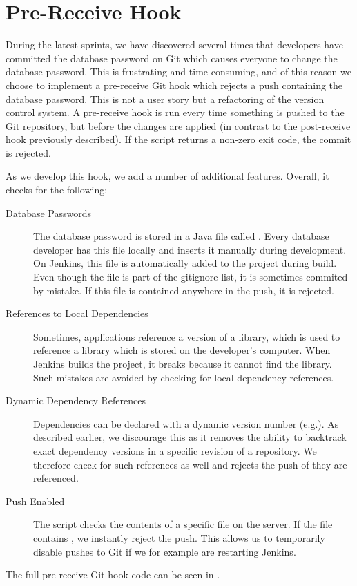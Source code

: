 \chapter{Pre-Receive Hook}
During the latest sprints, we have discovered several times that developers have committed the database password on Git which causes everyone to change the database password. This is frustrating and time consuming, and of this reason we choose to implement a pre-receive Git hook which rejects a push containing the database password. This is not a user story but a refactoring of the version control system. A pre-receive hook is run every time something is pushed to the Git repository, but before the changes are applied (in contrast to the post-receive hook previously described). If the script returns a non-zero exit code, the commit is rejected.

As we develop this hook, we add a number of additional features. Overall, it checks for the following:
\begin{description}
  \item[Database Passwords] The database password is stored in a Java file called . Every database developer has this file locally and inserts it manually during development. On Jenkins, this file is automatically added to the project during build. Even though the file is part of the gitignore list, it is sometimes commited by mistake. If this file is contained anywhere in the push, it is rejected.
  \item[References to Local Dependencies] Sometimes, applications reference a  version of a library, which is used to reference a library which is stored on the developer's computer. When Jenkins builds the project, it breaks because it cannot find the library. Such mistakes are avoided by checking for local dependency references.
  \item[Dynamic Dependency References] Dependencies can be declared with a dynamic version number (e.g.\@ {}). As described earlier, we discourage this as it removes the ability to backtrack exact dependency versions in a specific revision of a repository. We therefore check for such references as well and rejects the push of they are referenced.
  \item[Push Enabled] The script checks the contents of a specific file on the server. If the file contains , we instantly reject the push. This allows us to temporarily disable pushes to Git if we for example are restarting Jenkins.
\end{description}
The full pre-receive Git hook code can be seen in .
